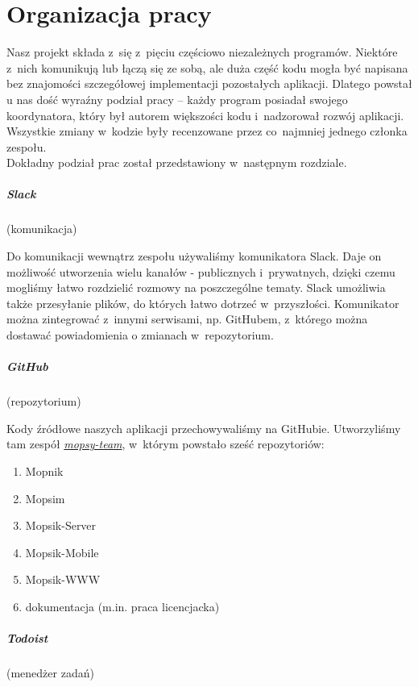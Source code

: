 \chapter{Organizacja pracy}
Nasz projekt składa z~się z~pięciu częściowo niezależnych programów. Niektóre z~nich komunikują lub łączą się ze sobą, ale duża część kodu mogła być napisana bez znajomości szczegółowej implementacji pozostałych aplikacji. Dlatego powstał u nas dość wyraźny podział pracy -- każdy program posiadał swojego koordynatora, który był autorem większości kodu i~nadzorował rozwój aplikacji. Wszystkie zmiany w~kodzie były recenzowane przez co~najmniej jednego członka zespołu.\\
Dokładny podział prac został przedstawiony w~następnym rozdziale. 

\paragraph{Slack}(komunikacja)

Do komunikacji wewnątrz zespołu używaliśmy komunikatora Slack. Daje on możliwość utworzenia wielu kanałów - publicznych i~prywatnych, dzięki czemu mogliśmy łatwo rozdzielić rozmowy na poszczególne tematy. Slack umożliwia także przesyłanie plików, do których łatwo dotrzeć w~przyszłości. Komunikator można zintegrować z~innymi serwisami, np. GitHubem, z~którego można dostawać powiadomienia o zmianach w~repozytorium.

\paragraph{GitHub}(repozytorium)

Kody źródłowe naszych aplikacji przechowywaliśmy na GitHubie. Utworzyliśmy tam zespół \href{https://github.com/mopsy-team}{\textit{mopsy-team}}\cite{mopsy-team}, w~którym powstało sześć repozytoriów:
\begin{enumerate}
\item Mopnik
\item Mopsim
\item Mopsik-Server
\item Mopsik-Mobile
\item Mopsik-WWW
\item dokumentacja (m.in. praca licencjacka)
\end{enumerate}

\paragraph{Todoist}(menedżer zadań)

